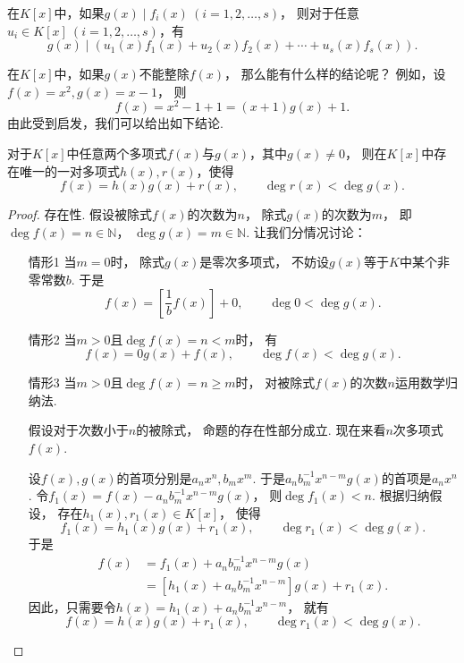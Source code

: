 \begin{proposition}
在\(K[x]\)中，如果\(g(x) \mid f_i(x)\ (i=1,2,\dotsc,s)\)，
则对于任意\(u_i \in K[x]\ (i=1,2,\dotsc,s)\)，有\[
	g(x) \mid (u_1(x) f_1(x) + u_2(x) f_2(x) + \dotsb + u_s(x) f_s(x)).
\]
\end{proposition}

在\(K[x]\)中，如果\(g(x)\)不能整除\(f(x)\)，
那么能有什么样的结论呢？
例如，设\(f(x)=x^2,
g(x)=x-1\)，
则\[
	f(x)=x^2-1+1=(x+1)g(x)+1.
\]
由此受到启发，我们可以给出如下结论.
\begin{theorem}\label{theorem:多项式.带余除法}
对于\(K[x]\)中任意两个多项式\(f(x)\)与\(g(x)\)，其中\(g(x)\neq0\)，
则在\(K[x]\)中存在唯一的一对多项式\(h(x),r(x)\)，使得\[
	f(x) = h(x) g(x) + r(x),
	\qquad
	\deg r(x) < \deg g(x).
\]
\begin{proof}
存在性.
假设被除式\(f(x)\)的次数为\(n\)，
除式\(g(x)\)的次数为\(m\)，
即\(\deg f(x)=n\in\mathbb{N}\)，
\(\deg g(x)=m\in\mathbb{N}\).
让我们分情况讨论：\begin{enumerate}
	\item[情形1]
	当\(m=0\)时，
	除式\(g(x)\)是零次多项式，
	不妨设\(g(x)\)等于\(K\)中某个非零常数\(b\).
	于是\[
		f(x) = \left[ \frac1b f(x) \right] + 0,
		\qquad
		\deg 0 < \deg g(x).
	\]

	\item[情形2]
	当\(m>0\)且\(\deg f(x) = n < m\)时，
	有\[
		f(x) = 0 g(x) + f(x), \qquad
		\deg f(x) < \deg g(x).
	\]

	\item[情形3]
	当\(m>0\)且\(\deg f(x) = n \geq m\)时，
	对被除式\(f(x)\)的次数\(n\)运用数学归纳法.

	假设对于次数小于\(n\)的被除式，
	命题的存在性部分成立.
	现在来看\(n\)次多项式\(f(x)\).

	设\(f(x),g(x)\)的首项分别是\(a_n x^n,b_m x^m\).
	于是\(a_n b_m^{-1} x^{n-m} g(x)\)的首项是\(a_n x^n\).
	令\(f_1(x) = f(x) - a_n b_m^{-1} x^{n-m} g(x)\)，
	则\(\deg f_1(x) < n\).
	根据归纳假设，
	存在\(h_1(x),r_1(x) \in K[x]\)，
	使得\[
		f_1(x) = h_1(x) g(x) + r_1(x), \qquad
		\deg r_1(x) < \deg g(x).
	\]
	于是\begin{align*}
		f(x)
		&= f_1(x) + a_n b_m^{-1} x^{n-m} g(x) \\
		&= [h_1(x) + a_n b_m^{-1} x^{n-m}] g(x) + r_1(x).
	\end{align*}
	因此，只需要令\(h(x) = h_1(x) + a_n b_m^{-1} x^{n-m}\)，
	就有\[
		f(x) = h(x) g(x) + r_1(x),
		\qquad
		\deg r_1(x) < \deg g(x).
	\]
\end{enumerate}


\end{proof}
\end{theorem}
